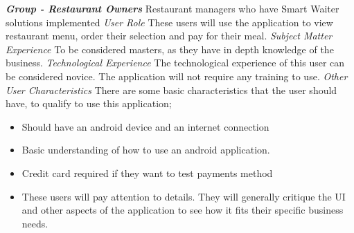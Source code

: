 \documentclass[12pt, titlepage]{article}
\begin{document}
\textbf{\textit{Group - Restaurant Owners}}\newline
Restaurant managers who have Smart Waiter solutions implemented \newline
\newline
\textit{User Role}\newline
These users will use the application to view restaurant menu, order their selection and pay for their meal.\newline\newline
\textit{Subject Matter Experience}\newline
To be considered masters, as they have in depth knowledge of the business. \newline\newline
\textit{Technological Experience}\newline
The technological experience of this user can be considered novice. The application will not require any training to use. \newline\newline
\textit{Other User Characteristics}\newline
There are some basic characteristics that the user should have, to qualify to use this application;
\begin{itemize}
  \item Should have an android device and an internet connection
  \item Basic understanding of how to use an android application. 
  \item 	Credit card required if they want to test payments method 
  \item 	These users will pay attention to details. They will generally critique the UI and other aspects of the application to see how it fits their specific business needs.
\end{itemize}
\end{document}
